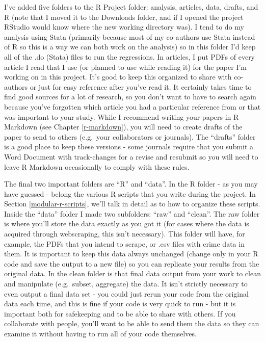 \documentclass[
]{krantz}
\begin{document}
I've added five folders to the R Project folder: analysis, articles, data, drafts, and R (note that I moved it to the Downloads folder, and if I opened the project RStudio would know where the new working directory was). I tend to do my analysis using Stata (primarily because most of my co-authors use Stata instead of R so this is a way we can both work on the analysis) so in this folder I'd keep all of the .do (Stata) files to run the regressions. In articles, I put PDFs of every article I read that I use (or planned to use while reading it) for the paper I'm working on in this project. It's good to keep this organized to share with co-authors or just for easy reference after you've read it. It certainly takes time to find good sources for a lot of research, so you don't want to have to search again because you've forgotten which article you had a particular reference from or that was important to your study. While I recommend writing your papers in R Markdown (see Chapter \ref{r-markdown}), you will need to create drafts of the paper to send to others (e.g.~your collaborators or journals). The ``drafts'' folder is a good place to keep these versions - some journals require that you submit a Word Document with track-changes for a revise and resubmit so you will need to leave R Markdown occasionally to comply with these rules.

The final two important folders are ``R'' and ``data''. In the R folder - as you may have guessed - belong the various R scripts that you write during the project. In Section \ref{modular-r-scripts}, we'll talk in detail as to how to organize these scripts. Inside the ``data'' folder I made two subfolders: ``raw'' and ``clean''. The raw folder is where you'll store the data exactly as you got it (for cases where the data is acquired through webscraping, this isn't necessary). This folder will have, for example, the PDFs that you intend to scrape, or .csv files with crime data in them. It is important to keep this data always unchanged (change only in your R code and save the output to a new file) so you can replicate your results from the original data. In the clean folder is that final data output from your work to clean and manipulate (e.g.~subset, aggregate) the data. It isn't strictly necessary to even output a final data set - you could just rerun your code from the original data each time, and this is fine if your code is very quick to run - but it is important both for safekeeping and to be able to share with others. If you collaborate with people, you'll want to be able to send them the data so they can examine it without having to run all of your code themselves.
\end{document}
